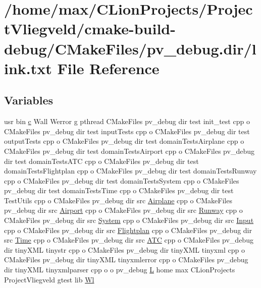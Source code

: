 \hypertarget{pv__debug_8dir_2link_8txt}{}\section{/home/max/\+C\+Lion\+Projects/\+Project\+Vliegveld/cmake-\/build-\/debug/\+C\+Make\+Files/pv\+\_\+debug.dir/link.txt File Reference}
\label{pv__debug_8dir_2link_8txt}
\subsection*{Variables}
\begin{DoxyCompactItemize}
\item 
usr bin \hyperlink{html_2jquery_8js_abce695e0af988ece0826d9ad59b8160d}{c} Wall Werror g pthread C\+Make\+Files pv\+\_\+debug dir test init\+\_\+test cpp o C\+Make\+Files pv\+\_\+debug dir test input\+Tests cpp o C\+Make\+Files pv\+\_\+debug dir test output\+Tests cpp o C\+Make\+Files pv\+\_\+debug dir test domain\+Tests\+Airplane cpp o C\+Make\+Files pv\+\_\+debug dir test domain\+Tests\+Airport cpp o C\+Make\+Files pv\+\_\+debug dir test domain\+Tests\+A\+TC cpp o C\+Make\+Files pv\+\_\+debug dir test domain\+Tests\+Flightplan cpp o C\+Make\+Files pv\+\_\+debug dir test domain\+Tests\+Runway cpp o C\+Make\+Files pv\+\_\+debug dir test domain\+Tests\+System cpp o C\+Make\+Files pv\+\_\+debug dir test domain\+Tests\+Time cpp o C\+Make\+Files pv\+\_\+debug dir test Test\+Utils cpp o C\+Make\+Files pv\+\_\+debug dir src \hyperlink{classAirplane}{Airplane} cpp o C\+Make\+Files pv\+\_\+debug dir src \hyperlink{classAirport}{Airport} cpp o C\+Make\+Files pv\+\_\+debug dir src \hyperlink{classRunway}{Runway} cpp o C\+Make\+Files pv\+\_\+debug dir src \hyperlink{classSystem}{System} cpp o C\+Make\+Files pv\+\_\+debug dir src \hyperlink{classInput}{Input} cpp o C\+Make\+Files pv\+\_\+debug dir src \hyperlink{classFlightplan}{Flightplan} cpp o C\+Make\+Files pv\+\_\+debug dir src \hyperlink{classTime}{Time} cpp o C\+Make\+Files pv\+\_\+debug dir src \hyperlink{classATC}{A\+TC} cpp o C\+Make\+Files pv\+\_\+debug dir tiny\+X\+ML tinystr cpp o C\+Make\+Files pv\+\_\+debug dir tiny\+X\+ML tinyxml cpp o C\+Make\+Files pv\+\_\+debug dir tiny\+X\+ML tinyxmlerror cpp o C\+Make\+Files pv\+\_\+debug dir tiny\+X\+ML tinyxmlparser cpp o o pv\+\_\+debug \hyperlink{html_2jquery_8js_a38ee4c0b5f4fe2a18d0c783af540d253}{L} home max C\+Lion\+Projects Project\+Vliegveld gtest lib \hyperlink{pv__debug_8dir_2link_8txt_aa5e644357d84ae459c5f0d9943e8869c}{Wl}

\end{DoxyCompactItemize}
